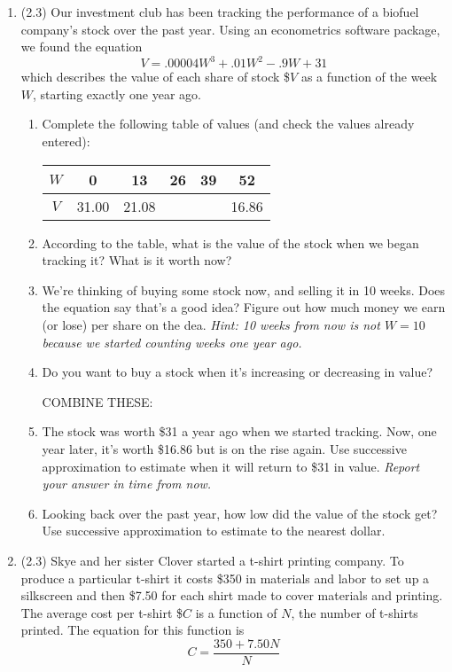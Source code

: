 \documentclass[12pt]{article}
\begin{document}
\begin{enumerate}
\item (2.3)  Our investment club has been tracking the performance of a biofuel company's stock over the past year.  Using an econometrics software package, we found the equation $$V =.00004W^3 + .01W^2 -.9W + 31$$ 
which describes the value of each share of stock \$$V$ as a function of the week $W$, starting exactly one year ago.  
\begin{enumerate}
\item Complete the following table of values (and check the values already entered):
\begin{center}
\begin{tabular} {|c|c|c |c|c|c |} \hline
$W$ & 0 & 13 & 26 & 39 & 52  \\ \hline
$V$ & 31.00 & 21.08 &\hspace{.4 in}~ & \hspace{.4 in}~ & 16.86 \\ \hline
\end{tabular}
\end{center}
\item According to the table, what is the value of the stock when we began tracking it?  What is it worth now? 
\item We're thinking of buying some stock now, and selling it in 10 weeks.  Does the equation say that's a good idea?  Figure out how much money we earn (or lose) per share on the dea.   \emph{Hint:  10 weeks from now is not $W=10$ because we started counting weeks one year ago.} 
\item Do you want to buy a stock when it's increasing or decreasing in value?

COMBINE THESE:
\item The stock was worth \$31 a year ago when we started tracking.  Now, one year later, it's worth \$16.86 but is on the rise again.  Use successive approximation to estimate when it will return to \$31 in value.  \emph{Report your answer in time from now.}
\item Looking back over the past year, how low did the value of the stock get?  Use successive approximation to estimate to the nearest dollar.
\end{enumerate} 

\item (2.3)  Skye and her sister Clover started a t-shirt printing company.  To produce a particular t-shirt it costs  \$350 in materials and labor to set up a silkscreen and then \$7.50 for each shirt made to cover materials and printing.  The average cost per t-shirt \$$C$ is a function of $N$, the number of t-shirts printed.  The equation for this function is $$C = \frac{350+7.50N}{N}$$


\end{enumerate}
\end{document}
